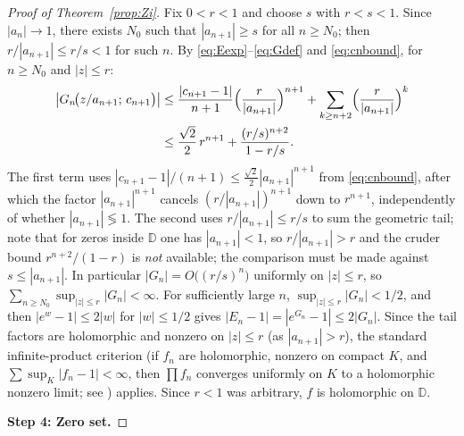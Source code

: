 \documentclass{amsart}
\theoremstyle{definition}
\newcommand{\D}{\mathbb{D}}
\newcommand{\abs}[1]{\left|#1\right|}
\begin{document}
\begin{proof}[Proof of Theorem~\ref{prop:Zi}]
Fix $0 < r < 1$ and choose $s$ with $r < s < 1$.  Since
$\abs{a_n} \to 1$, there exists $N_0$ such that $\abs{a_{n+1}} \geq s$
for all $n \geq N_0$; then $r/\abs{a_{n+1}} \leq r/s < 1$ for such $n$.
By \eqref{eq:Eexp}--\eqref{eq:Gdef} and \eqref{eq:cnbound}, for $n \geq
N_0$ and $\abs{z} \leq r$:
\begin{align*}
  \abs{G_n\!\bigl(z/a_{n+1};\,c_{n+1}\bigr)}
  &\leq \frac{\abs{c_{n+1}-1}}{n+1}\Bigl(\frac{r}{\abs{a_{n+1}}}\Bigr)^{n+1}
    + \sum_{k \geq n+2} \Bigl(\frac{r}{\abs{a_{n+1}}}\Bigr)^k \\
  &\leq \frac{\sqrt{2}}{2}\,r^{n+1}
    + \frac{(r/s)^{n+2}}{1-r/s}.
\end{align*}
The first term uses $\abs{c_{n+1}-1}/(n+1) \leq
\frac{\sqrt{2}}{2}\abs{a_{n+1}}^{n+1}$ from \eqref{eq:cnbound}, after
which the factor $\abs{a_{n+1}}^{n+1}$ cancels
$(r/\abs{a_{n+1}})^{n+1}$ down to $r^{n+1}$, independently of whether
$\abs{a_{n+1}} \lessgtr 1$.  The second uses $r/\abs{a_{n+1}} \leq r/s$
to sum the geometric tail; note that for zeros inside $\D$ one has
$\abs{a_{n+1}} < 1$, so $r/\abs{a_{n+1}} > r$ and the cruder bound
$r^{n+2}/(1-r)$ is \emph{not} available; the comparison must be made
against $s \leq \abs{a_{n+1}}$.  In particular
$\abs{G_n} = O\bigl((r/s)^{n}\bigr)$ uniformly on $\abs{z} \leq r$, so
$\sum_{n \geq N_0} \sup_{\abs{z}\leq r} \abs{G_n} < \infty$.  For
sufficiently large $n$,
$\sup_{\abs{z}\leq r}\abs{G_n} < 1/2$, and then $\abs{e^w - 1} \leq
2\abs{w}$ for $\abs{w} \leq 1/2$ gives $\abs{E_n - 1} = \abs{e^{G_n}
- 1} \leq 2\abs{G_n}$.  Since the tail factors are holomorphic and
nonzero on $\abs{z} \leq r$ (as $\abs{a_{n+1}} > r$), the standard
infinite-product criterion (if $f_n$ are holomorphic, nonzero on
compact $K$, and $\sum \sup_K \abs{f_n - 1} < \infty$, then $\prod
f_n$ converges uniformly on $K$ to a holomorphic nonzero limit; see
\cite[Ch.~5, Thm.~1.1]{Conway}) applies.  Since $r < 1$ was arbitrary,
$f$ is holomorphic on $\D$.

\medskip\noindent\textbf{Step 4: Zero set.}


\end{proof}
\end{document}

